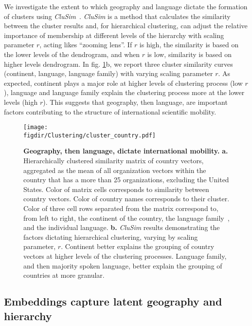 \documentclass[12pt]{article} %
\def\figdir{../Figs}
\begin{document}
We investigate the extent to which geography and language dictate the formation of clusters using \textit{CluSim}~\autocite{gates2019element}.
\textit{CluSim} is a method that calculates the similarity between the cluster results and, for hierarchical clustering, can adjust the relative importance of membership at different levels of the hierarchy with scaling parameter $r$, acting likes ``zooming lens''.  
If $r$ is high, the similarity is based on the lower levels of the dendrogram, and when $r$ is low, similarity is based on higher levels dendrogram. 
In fig. \ref{fig:clustering}b, we report three cluster similarity curves (continent, language, language family) with varying scaling parameter $r$.
As expected, continent plays a major role at higher levels of clustering process (low $r$), language and language family explain the clustering process more at the lower levels (high $r$). 
This suggests that geography, then language, are important factors contributing to the structure of international scientific mobility.

%
%
\begin{figure}[p!]
	\centering
	\label{fig:clustering}
	\texttt{[image: \\figdir/Clustering/cluster\_country.pdf]}
	\caption{
		\textbf{Geography, then language, dictate international mobility.}
		\textbf{a.} Hierarchically clustered similarity matrix of country vectors, aggregated as the mean of all organization vectors within the country that has a more than 25 organizations, excluding the United States. 
		Color of matrix cells corresponds to similarity between country vectors.
		Color of country names corresponds to their cluster.
		Color of three cell rows separated from the matrix correspond to, from left to right, the continent of the country, the language family~\autocite{ethnologue}, and the individual language. 
		\textbf{b.}	\textit{CluSim} \autocite{gates2019element} results demonstrating the factors dictating hierarchical clustering, varying by scaling parameter, $r$. 
		Continent better explains the grouping of country vectors at higher levels of the clustering processes.
		Language family, and then majority spoken language, better explain the grouping of countries at more granular. 
	}
\end{figure}


%
% 
\subsection*{Embeddings capture latent geography and hierarchy}
\end{document}
